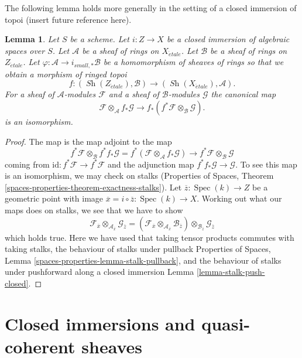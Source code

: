 \documentclass{stacks-project}
\theoremstyle{plain}
\newtheorem{lemma}[subsection]{Lemma}
\theoremstyle{definition}
\theoremstyle{remark}
\numberwithin{equation}{subsection}
\def\Spec{\mathop{\mathrm{Spec}}}
\def\Sh{\mathop{\mathit{Sh}}\nolimits}
\def\etale{{\acute{e}tale}}
\begin{document}
\noindent
The following lemma holds more generally in the setting of a closed
immersion of topoi (insert future reference here).

\begin{lemma}
\label{lemma-closed-immersion-rings}
Let $S$ be a scheme. Let $i : Z \to X$ be a closed immersion of algebraic
spaces over $S$. Let $\mathcal{A}$ be a sheaf of rings on $X_\etale$.
Let $\mathcal{B}$ be a sheaf of rings on $Z_\etale$.
Let $\varphi : \mathcal{A} \to i_{small, *}\mathcal{B}$
be a homomorphism of sheaves of rings so that we obtain a
morphism of ringed topoi
$$
f : (\Sh(Z_\etale), \mathcal{B}) \longrightarrow (\Sh(X_\etale), \mathcal{A}).
$$
For a sheaf of $\mathcal{A}$-modules $\mathcal{F}$ and a
sheaf of $\mathcal{B}$-modules $\mathcal{G}$ the canonical map
$$
\mathcal{F} \otimes_\mathcal{A} f_*\mathcal{G}
\longrightarrow
f_*(f^*\mathcal{F} \otimes_\mathcal{B} \mathcal{G}).
$$
is an isomorphism.
\end{lemma}

\begin{proof}
The map is the map adjoint to the map
$$
f^*\mathcal{F} \otimes_\mathcal{B}
f^* f_*\mathcal{G} =
f^*(\mathcal{F} \otimes_\mathcal{A} f_*\mathcal{G})
\longrightarrow
f^*\mathcal{F} \otimes_\mathcal{B} \mathcal{G}
$$
coming from $\text{id} : f^*\mathcal{F} \to f^*\mathcal{F}$
and the adjunction map $f^* f_*\mathcal{G} \to \mathcal{G}$.
To see this map is an isomorphism, we may check on stalks
(Properties of Spaces, Theorem
\ref{spaces-properties-theorem-exactness-stalks}).
Let $\overline{z} : \Spec(k) \to Z$ be a geometric point with
image $\overline{x} = i \circ \overline{z} : \Spec(k) \to X$.
Working out what our maps does on stalks, we see that we
have to show
$$
\mathcal{F}_{\overline{x}}
\otimes_{\mathcal{A}_{\overline{x}}}
\mathcal{G}_{\overline{z}} =
(\mathcal{F}_{\overline{x}}
\otimes_{\mathcal{A}_{\overline{x}}}
\mathcal{B}_{\overline{z}}) \otimes_{\mathcal{B}_{\overline{z}}}
\mathcal{G}_{\overline{z}}
$$
which holds true. Here we have used that
taking tensor products commutes with taking stalks, the
behaviour of stalks under pullback
Properties of Spaces, Lemma \ref{spaces-properties-lemma-stalk-pullback}, and
the behaviour of stalks under pushforward along a closed immersion
Lemma \ref{lemma-stalk-push-closed}.
\end{proof}






\section{Closed immersions and quasi-coherent sheaves}
\label{section-closed-immersions-quasi-coherent}
\end{document}
